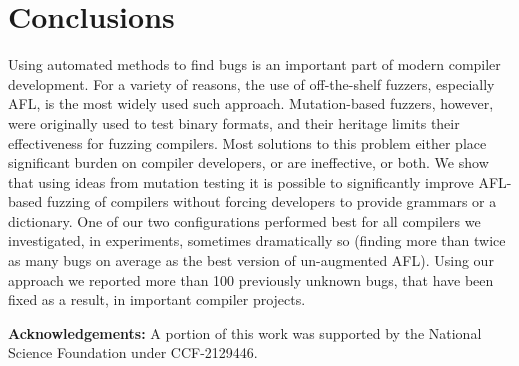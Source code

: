 \section{Conclusions}

Using automated methods to find bugs is an important part of modern
compiler development.  For a variety of reasons, the use of
off-the-shelf fuzzers, especially AFL, is the most widely used such
approach.  Mutation-based fuzzers, however, were originally used to
test binary formats, and their heritage limits their effectiveness for
fuzzing compilers.  Most solutions to this problem either place significant
burden on compiler developers, or are ineffective, or both.  We show
that using ideas from mutation testing it is possible to significantly
improve AFL-based fuzzing of compilers without forcing developers to
provide grammars or a dictionary.  One of our two configurations
performed best for all compilers we investigated, in experiments,
sometimes dramatically so (finding more than twice as many bugs on
average as the best version of un-augmented AFL).  Using our approach
we reported more than 100 previously unknown bugs, that have been
fixed as a result, in important
compiler projects.

{\small {\bf {Acknowledgements:}}  A portion of this work was supported by the National Science Foundation under CCF-2129446.}